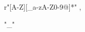 \begin{module}{}


\begin{syntaxBlock}{}
  \syntax
    {r"[A-Z][\_a-zA-Z0-9@]*"}
    {, }
\end{syntaxBlock}

\begin{syntaxBlock}{}
  \syntaxNoEq
    {"\_"}
    {}
\end{syntaxBlock}

\end{module}